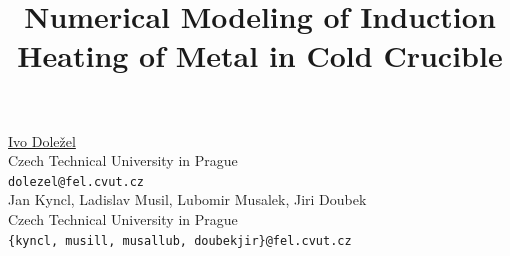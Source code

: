 \documentclass[article, A4, 11pt]{llncs}%
\begin{document}
\title{Numerical Modeling of Induction Heating of Metal in Cold Crucible}
 \author{} \institute{}
\maketitle
\begin{center}
{\large \underline{Ivo Doležel}}\\
Czech Technical University in Prague\\
{\tt dolezel@fel.cvut.cz}
\\ \vspace{4mm}
{\large Jan  Kyncl, Ladislav  Musil, Lubomir Musalek, Jiri Doubek}\\
Czech Technical University in Prague\\
{\tt \{kyncl, musill, musallub, doubekjir\}@fel.cvut.cz}

\end{center}
\end{document}
